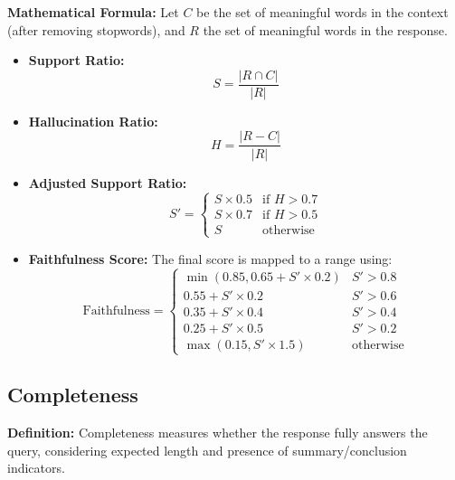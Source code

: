 \textbf{Mathematical Formula:}
Let $C$ be the set of meaningful words in the context (after removing stopwords), and $R$ the set of meaningful words in the response.
\begin{itemize}
    \item \textbf{Support Ratio:}
    \[
    S = \frac{|R \cap C|}{|R|}
    \]
    \item \textbf{Hallucination Ratio:}
    \[
    H = \frac{|R - C|}{|R|}
    \]
    \item \textbf{Adjusted Support Ratio:}
    \[
    S' = \begin{cases}
        S \times 0.5 & \text{if } H > 0.7 \\
        S \times 0.7 & \text{if } H > 0.5 \\
        S & \text{otherwise}
    \end{cases}
    \]
    \item \textbf{Faithfulness Score:}
    The final score is mapped to a range using:
    \[
    \text{Faithfulness} =
    \begin{cases}
        \min(0.85, 0.65 + S' \times 0.2) & S' > 0.8 \\
        0.55 + S' \times 0.2 & S' > 0.6 \\
        0.35 + S' \times 0.4 & S' > 0.4 \\
        0.25 + S' \times 0.5 & S' > 0.2 \\
        \max(0.15, S' \times 1.5) & \text{otherwise}
    \end{cases}
    \]
\end{itemize}

\subsection{Completeness}
\textbf{Definition:} Completeness measures whether the response fully answers the query, considering expected length and presence of summary/conclusion indicators.

